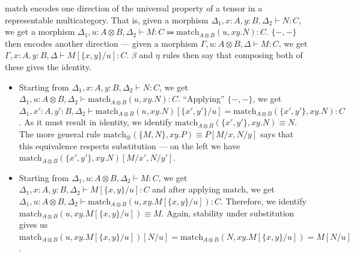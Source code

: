 \begin{remark}
  $\text{match}$ encodes one direction of the universal property of a tensor in a representable multicategory.
  That is, given a morphism $\Delta_1, x : A, y : B, \Delta_2 \vdash N : C$, we get a morphism $\Delta_1, u : A \otimes B, \Delta_2 \vdash M : C \Coloneqq \text{match}_{A \otimes B}(u, xy.N) : C$.
  $\{-,-\}$ then encodes another direction --- given a morphism $\Gamma, u : A \otimes B, \Delta \vdash M : C$, we get $\Gamma, x : A, y : B, \Delta \vdash M[\{x,y\} / u] : C$.
  $\beta$ and $\eta$ rules then say that composing both of these gives the identity.
  \begin{itemize}
    \item Starting from $\Delta_1, x : A, y : B, \Delta_2 \vdash N : C$, we get $\Delta_1, u : A \otimes B, \Delta_2 \vdash \text{match}_{A \otimes B}(u, xy.N) : C$.
    \enquote{Applying} $\{-,-\}$, we get $\Delta_1, x' : A, y' : B, \Delta_2 \vdash \text{match}_{A \otimes B}(u, xy.N)[\{x',y'\} / u] = \text{match}_{A \otimes B}(\{x', y'\}, xy.N) : C$.
    As it must result in identity, we identify $\text{match}_{A \otimes B}(\{x', y'\}, xy.N) \equiv N$.
    The more general rule $\text{match}_{\otimes}(\{M,N\}, xy.P) \equiv P[M / x, N / y]$ says that this equivalence respects substitution --- on the left we have $\text{match}_{A \otimes B}(\{x', y'\}, xy.N)[M / x', N / y']$.
    \item Starting from $\Delta_1, u : A \otimes B, \Delta_2 \vdash M : C$, we get $\Delta_1, x : A, y : B, \Delta_2 \vdash M[\{x,y\} / u] : C$ and after applying $\text{match}$, we get $\Delta_1, u : A \otimes B, \Delta_2 \vdash \text{match}_{A \otimes B}(u, xy.M[\{x,y\} / u]) : C$.
    Therefore, we identify $\text{match}_{A \otimes B}(u, xy.M[\{x,y\} / u]) \equiv M$.
    Again, stability under substitution gives us $\text{match}_{A \otimes B}(u, xy.M[\{x,y\} / u])[N / u] = \text{match}_{A \otimes B}(N, xy.M[\{x,y\} / u]) = M[N/u]$.
  \end{itemize}
\end{remark}

